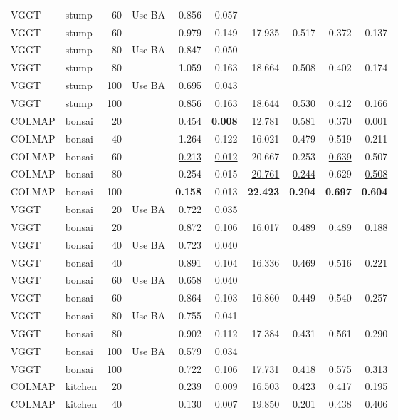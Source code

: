 \begin{table}[H]
\begin{tabular}{llrlrrrrrr}
VGGT & stump & 60 & Use BA & 0.856 & 0.057 &  &  &  &  \\
VGGT & stump & 60 &  & 0.979 & 0.149 & 17.935 & 0.517 & 0.372 & 0.137 \\
VGGT & stump & 80 & Use BA & 0.847 & 0.050 &  &  &  &  \\
VGGT & stump & 80 &  & 1.059 & 0.163 & 18.664 & 0.508 & 0.402 & 0.174 \\
VGGT & stump & 100 & Use BA & 0.695 & 0.043 &  &  &  &  \\
VGGT & stump & 100 &  & 0.856 & 0.163 & 18.644 & 0.530 & 0.412 & 0.166 \\
\midrule
COLMAP & bonsai & 20 &  & 0.454 & \textbf{0.008} & 12.781 & 0.581 & 0.370 & 0.001 \\
COLMAP & bonsai & 40 &  & 1.264 & 0.122 & 16.021 & 0.479 & 0.519 & 0.211 \\
COLMAP & bonsai & 60 &  & \underline{0.213} & \underline{0.012} & 20.667 & 0.253 & \underline{0.639} & 0.507 \\
COLMAP & bonsai & 80 &  & 0.254 & 0.015 & \underline{20.761} & \underline{0.244} & 0.629 & \underline{0.508} \\
COLMAP & bonsai & 100 &  & \textbf{0.158} & 0.013 & \textbf{22.423} & \textbf{0.204} & \textbf{0.697} & \textbf{0.604} \\
VGGT & bonsai & 20 & Use BA & 0.722 & 0.035 &  &  &  &  \\
VGGT & bonsai & 20 &  & 0.872 & 0.106 & 16.017 & 0.489 & 0.489 & 0.188 \\
VGGT & bonsai & 40 & Use BA & 0.723 & 0.040 &  &  &  &  \\
VGGT & bonsai & 40 &  & 0.891 & 0.104 & 16.336 & 0.469 & 0.516 & 0.221 \\
VGGT & bonsai & 60 & Use BA & 0.658 & 0.040 &  &  &  &  \\
VGGT & bonsai & 60 &  & 0.864 & 0.103 & 16.860 & 0.449 & 0.540 & 0.257 \\
VGGT & bonsai & 80 & Use BA & 0.755 & 0.041 &  &  &  &  \\
VGGT & bonsai & 80 &  & 0.902 & 0.112 & 17.384 & 0.431 & 0.561 & 0.290 \\
VGGT & bonsai & 100 & Use BA & 0.579 & 0.034 &  &  &  &  \\
VGGT & bonsai & 100 &  & 0.722 & 0.106 & 17.731 & 0.418 & 0.575 & 0.313 \\
\midrule
COLMAP & kitchen & 20 &  & 0.239 & 0.009 & 16.503 & 0.423 & 0.417 & 0.195 \\
COLMAP & kitchen & 40 &  & 0.130 & 0.007 & 19.850 & 0.201 & 0.438 & 0.406 \\

\end{tabular}
\end{table}
